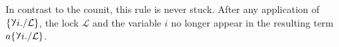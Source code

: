 \documentclass[10pt]{article}
\theoremstyle{definition}
\let\oldequiv\equiv%
\renewcommand{\equiv}{\simeq}
\newcommand{\defeq}{\oldequiv}
\newcommand{\key}{\mathchoice
  {\scalebox{0.8}{\text{\faKey}}} {\scalebox{0.8}{\text{\faKey}}}
  {\scalebox{0.5}{\text{\faKey}}} {\scalebox{0.4}{\text{\faKey}}} }
\newcommand{\rbindsym}{%
  \mathchoice
    {\reflectbox{\rotatebox[origin=c]{185}{$\lambda$}}}  %
    {\reflectbox{\rotatebox[origin=c]{185}{$\lambda$}}}  %
    {\reflectbox{\rotatebox[origin=c]{185}{$\scriptstyle\lambda$}}}  %
    {\reflectbox{\rotatebox[origin=c]{185}{$\scriptscriptstyle\lambda$}}}  %
  }
\newcommand{\lockn}[1]{\mathcal{#1}}
\newcommand{\varkeye}[2]{\key_{#1}^{#2}}
\newcommand{\varkey}[2]{\varkeye{\lockn{#1}}{#2}}
\newcommand{\admkeye}[2]{\overrightarrow{\key}_{#1}^{#2}}
\newcommand{\admkey}[2]{\admkeye{\lockn{#1}}{#2}}
\newcommand{\stubra}[1]{\{\!\!\{ #1 \}\!\!\}}
\newcommand{\admbra}[1]{\{\mkern-1mu #1 \mkern-0.5mu\}}
\newcommand{\subkeysep}[2]{#1/#2}
\newcommand{\subkeyo}[2]{\subkeysep{#1}{\lockn{#2}}}
\newcommand{\subkey}[2]{\admbra{\subkeyo{#1}{#2}}}
\newcommand{\sublock}[2]{\admbra{\rbindsym{} #1. /\lockn{#2} }}
\begin{document}


In contrast to the counit, this rule is never stuck. After any
application of $\sublock{i}{L}$, the lock $\lockn{L}$ and the
variable $i$ no longer appear in the resulting term
$a\sublock{i}{L}$.
  
\end{document}
